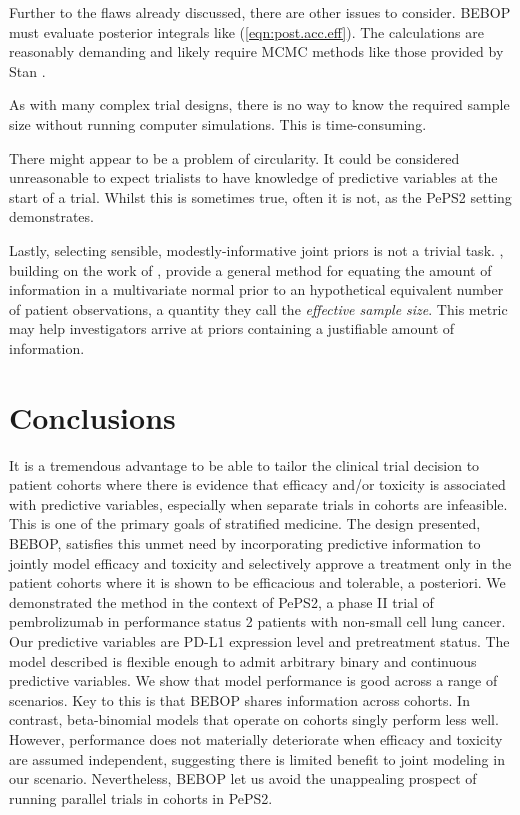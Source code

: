 \documentclass[alpha-refs]{wiley-article}
\begin{document}
Further to the flaws already discussed, there are other issues to consider.
BEBOP must evaluate posterior integrals like (\ref{eqn:post.acc.eff}).
The calculations are reasonably demanding and likely require MCMC methods like those provided by Stan \citep{Carpenter2016}.

As with many complex trial designs, there is no way to know the required sample size without running computer simulations.
This is time-consuming.

There might appear to be a problem of circularity.
It could be considered unreasonable to expect trialists to have knowledge of predictive variables at the start of a trial.
Whilst this is sometimes true, often it is not, as the PePS2 setting demonstrates.

Lastly, selecting sensible, modestly-informative joint priors is not a trivial task.
\cite{Thall2014}, building on the work of \cite{Morita2014}, provide a general method for equating the amount of information in a multivariate normal prior to an hypothetical equivalent number of patient observations, a quantity they call the \textit{effective sample size}.
This metric may help investigators arrive at priors containing a justifiable amount of information.  





\section{Conclusions}
\label{s:conclusions}
It is a tremendous advantage to be able to tailor the clinical trial decision to patient cohorts where there is evidence that efficacy and/or toxicity is associated with predictive variables, especially when separate trials in cohorts are infeasible.
This is one of the primary goals of stratified medicine.
The design presented, BEBOP, satisfies this unmet need by incorporating predictive information to jointly model efficacy and toxicity and selectively approve a treatment only in the patient cohorts where it is shown to be efficacious and tolerable, a posteriori.
We demonstrated the method in the context of PePS2, a phase II trial of pembrolizumab in performance status 2 patients with non-small cell lung cancer.
Our predictive variables are PD-L1 expression level and pretreatment status. 
The model described is flexible enough to admit arbitrary binary and continuous predictive variables.
We show that model performance is good across a range of scenarios.
Key to this is that BEBOP shares information across cohorts.
In contrast, beta-binomial models that operate on cohorts singly perform less well.
However, performance does not materially deteriorate when efficacy and toxicity are assumed independent, suggesting there is limited benefit to joint modeling in our scenario.
Nevertheless, BEBOP let us avoid the unappealing prospect of running parallel trials in cohorts in PePS2.
\end{document}
